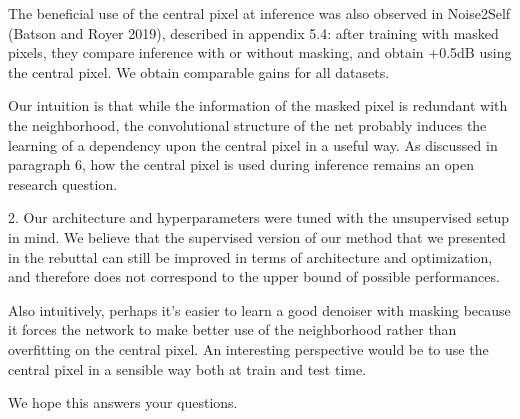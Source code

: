 \documentclass{article}
\begin{document}
The beneficial use of the central pixel at inference was also observed in Noise2Self (Batson and Royer 2019), described in appendix 5.4: after training with masked pixels, they compare inference with or without masking, and obtain +0.5dB using the central pixel. We obtain comparable gains for all datasets.

Our intuition is that while the information of the masked pixel is redundant with the neighborhood, the convolutional structure of the net probably induces the learning of a dependency upon the central pixel in a useful way. As discussed in paragraph 6, how the central pixel is used during inference remains an open research question.


2. Our architecture and hyperparameters were tuned with the unsupervised setup in mind. We believe that the supervised version of our method that we presented in the rebuttal can still be improved in terms of architecture and optimization, and therefore does not correspond to the upper bound of possible performances.

Also intuitively, perhaps it’s easier to learn a good denoiser with masking because it forces the network to make better use of the neighborhood rather than overfitting on the central pixel. An interesting perspective would be to use the central pixel in a sensible way both at train and test time.

We hope this answers your questions.
\end{document}
